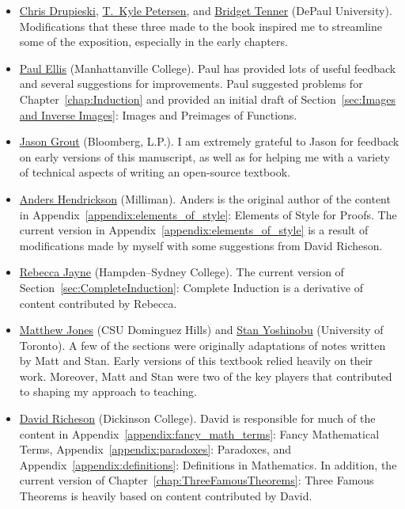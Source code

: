 \begin{itemize}
\item \href{https://math.depaul.edu/cdrupies/}{Chris Drupieski}, \href{http://math.depaul.edu/tpeter21/}{T.~Kyle Petersen}, and \href{http://math.depaul.edu/bridget/}{Bridget Tenner} (DePaul University). Modifications that these three made to the book inspired me to streamline some of the exposition, especially in the early chapters.
\item \href{http://www.paulellis.org}{Paul Ellis} (Manhattanville College). Paul has provided lots of useful feedback and several suggestions for improvements. Paul suggested problems for Chapter~\ref{chap:Induction} and provided an initial draft of Section~\ref{sec:Images and Inverse Images}: Images and Preimages of Functions.
\item \href{http://jasongrout.org}{Jason Grout} (Bloomberg, L.P.).  I am extremely grateful to Jason for feedback on early versions of this manuscript, as well as for helping me with a variety of technical aspects of writing an open-source textbook.
\item \href{https://www.linkedin.com/in/andershendrickson/}{Anders Hendrickson} (Milliman). Anders is the original author of the content in Appendix~\ref{appendix:elements_of_style}: Elements of Style for Proofs. The current version in Appendix~\ref{appendix:elements_of_style} is a result of modifications made by myself with some suggestions from David Richeson.
\item \href{http://www.hsc.edu/rebecca-jayne}{Rebecca Jayne} (Hampden--Sydney College). The current version of Section~\ref{sec:CompleteInduction}: Complete Induction is a derivative of content contributed by Rebecca.
\item \href{http://www4.csudh.edu/library/info/civic-directory/f-j/matthew-g-jones}{Matthew Jones} (CSU Dominguez Hills) and \href{http://www.stanyoshinobu.com}{Stan Yoshinobu} (University of Toronto). A few of the sections were originally adaptations of notes written by Matt and Stan. Early versions of this textbook relied heavily on their work. Moreover, Matt and Stan were two of the key players that contributed to shaping my approach to teaching.
\item \href{http://users.dickinson.edu/~richesod/}{David Richeson} (Dickinson College). David is responsible for much of the content in Appendix~\ref{appendix:fancy_math_terms}: Fancy Mathematical Terms, Appendix~\ref{appendix:paradoxes}: Paradoxes, and Appendix~\ref{appendix:definitions}: Definitions in Mathematics. In addition, the current version of Chapter~\ref{chap:ThreeFamousTheorems}: Three Famous Theorems is heavily based on content contributed by David.

\end{itemize}
